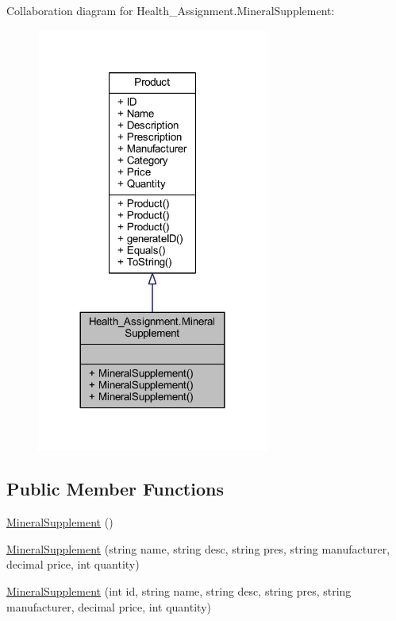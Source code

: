 Collaboration diagram for Health\+\_\+\+Assignment.\+Mineral\+Supplement\+:\nopagebreak
\begin{figure}[H]
\begin{center}
\leavevmode
\includegraphics[width=216pt]{class_health___assignment_1_1_mineral_supplement__coll__graph}
\end{center}
\end{figure}
\subsection*{Public Member Functions}
\begin{DoxyCompactItemize}
\item 
\hyperlink{class_health___assignment_1_1_mineral_supplement_a3fbcc3d05594813b1dc0feb7d85b6ee7}{Mineral\+Supplement} ()
\item 
\hyperlink{class_health___assignment_1_1_mineral_supplement_a4422654d628d77cb1487cf02e382e0e3}{Mineral\+Supplement} (string name, string desc, string pres, string manufacturer, decimal price, int quantity)
\item 
\hyperlink{class_health___assignment_1_1_mineral_supplement_a1850dd4d50b6456ffb0c298ed3d827ae}{Mineral\+Supplement} (int id, string name, string desc, string pres, string manufacturer, decimal price, int quantity)
\end{DoxyCompactItemize}

